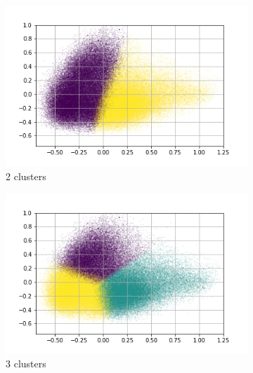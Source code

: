 \begin{figure}
     \centering
     \begin{subfigure}[b]{0.4\textwidth}
         \centering
         \includegraphics[width=\textwidth]{results/TopicDetection/es/PCA_2.png}
         \caption{2 clusters}
         \label{fig:es_kmeans_2}
     \end{subfigure}
     \hfill
     \begin{subfigure}[b]{0.4\textwidth}
         \centering
         \includegraphics[width=\textwidth]{results/TopicDetection/es/PCA_3.png}
         \caption{3 clusters}
         \label{fig:es_kmeans_3}
     \end{subfigure}
     \hfill
     \begin{subfigure}[b]{0.4\textwidth}
         \centering

\end{subfigure}
\end{figure}
